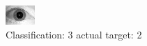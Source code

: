 \begin{figure}[h!]
\begin{center}
\includegraphics[width=0.60\columnwidth]{figures/ID1710_class_3_target_2.png}
\end{center}
\caption{ Classification: 3 actual target: 2}
\label{fig:ID1710_class_3_target_2}
\end{figure}
